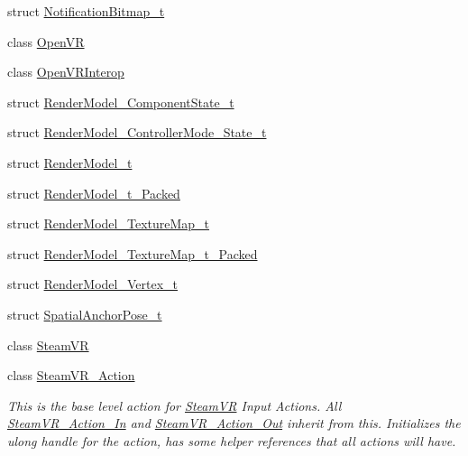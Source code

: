 \begin{DoxyCompactItemize}
\item 
struct \mbox{\hyperlink{struct_valve_1_1_v_r_1_1_notification_bitmap__t}{Notification\+Bitmap\+\_\+t}}
\item 
class \mbox{\hyperlink{class_valve_1_1_v_r_1_1_open_v_r}{Open\+VR}}
\item 
class \mbox{\hyperlink{class_valve_1_1_v_r_1_1_open_v_r_interop}{Open\+V\+R\+Interop}}
\item 
struct \mbox{\hyperlink{struct_valve_1_1_v_r_1_1_render_model___component_state__t}{Render\+Model\+\_\+\+Component\+State\+\_\+t}}
\item 
struct \mbox{\hyperlink{struct_valve_1_1_v_r_1_1_render_model___controller_mode___state__t}{Render\+Model\+\_\+\+Controller\+Mode\+\_\+\+State\+\_\+t}}
\item 
struct \mbox{\hyperlink{struct_valve_1_1_v_r_1_1_render_model__t}{Render\+Model\+\_\+t}}
\item 
struct \mbox{\hyperlink{struct_valve_1_1_v_r_1_1_render_model__t___packed}{Render\+Model\+\_\+t\+\_\+\+Packed}}
\item 
struct \mbox{\hyperlink{struct_valve_1_1_v_r_1_1_render_model___texture_map__t}{Render\+Model\+\_\+\+Texture\+Map\+\_\+t}}
\item 
struct \mbox{\hyperlink{struct_valve_1_1_v_r_1_1_render_model___texture_map__t___packed}{Render\+Model\+\_\+\+Texture\+Map\+\_\+t\+\_\+\+Packed}}
\item 
struct \mbox{\hyperlink{struct_valve_1_1_v_r_1_1_render_model___vertex__t}{Render\+Model\+\_\+\+Vertex\+\_\+t}}
\item 
struct \mbox{\hyperlink{struct_valve_1_1_v_r_1_1_spatial_anchor_pose__t}{Spatial\+Anchor\+Pose\+\_\+t}}
\item 
class \mbox{\hyperlink{class_valve_1_1_v_r_1_1_steam_v_r}{Steam\+VR}}
\item 
class \mbox{\hyperlink{class_valve_1_1_v_r_1_1_steam_v_r___action}{Steam\+V\+R\+\_\+\+Action}}
\begin{DoxyCompactList}\small\item\em This is the base level action for \mbox{\hyperlink{class_valve_1_1_v_r_1_1_steam_v_r}{Steam\+VR}} Input Actions. All \mbox{\hyperlink{class_valve_1_1_v_r_1_1_steam_v_r___action___in}{Steam\+V\+R\+\_\+\+Action\+\_\+\+In}} and \mbox{\hyperlink{class_valve_1_1_v_r_1_1_steam_v_r___action___out}{Steam\+V\+R\+\_\+\+Action\+\_\+\+Out}} inherit from this. Initializes the ulong handle for the action, has some helper references that all actions will have. \end{DoxyCompactList}\item 

\end{DoxyCompactItemize}
